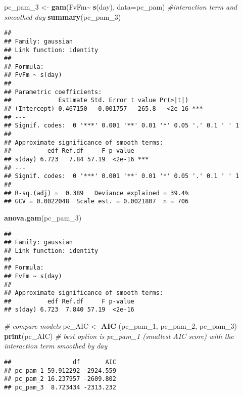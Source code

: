 \documentclass[
]{article}
\newenvironment{Shaded}{\begin{snugshade}}{\end{snugshade}}
\newcommand{\AttributeTok}[1]{\textcolor[rgb]{0.13,0.29,0.53}{#1}}
\newcommand{\CommentTok}[1]{\textcolor[rgb]{0.56,0.35,0.01}{\textit{#1}}}
\newcommand{\FunctionTok}[1]{\textcolor[rgb]{0.13,0.29,0.53}{\textbf{#1}}}
\newcommand{\NormalTok}[1]{#1}
\newcommand{\OtherTok}[1]{\textcolor[rgb]{0.56,0.35,0.01}{#1}}
\newcommand{\SpecialCharTok}[1]{\textcolor[rgb]{0.81,0.36,0.00}{\textbf{#1}}}
\begin{document}
\begin{Shaded}
\begin{Highlighting}[]
\NormalTok{pc\_pam\_3 }\OtherTok{\textless{}{-}} \FunctionTok{gam}\NormalTok{(FvFm}\SpecialCharTok{\textasciitilde{}} \FunctionTok{s}\NormalTok{(day), }\AttributeTok{data=}\NormalTok{pc\_pam) }\CommentTok{\#interaction term and smoothed day}
\FunctionTok{summary}\NormalTok{(pc\_pam\_3)}
\end{Highlighting}
\end{Shaded}

\begin{verbatim}
## 
## Family: gaussian 
## Link function: identity 
## 
## Formula:
## FvFm ~ s(day)
## 
## Parametric coefficients:
##             Estimate Std. Error t value Pr(>|t|)    
## (Intercept) 0.467150   0.001757   265.8   <2e-16 ***
## ---
## Signif. codes:  0 '***' 0.001 '**' 0.01 '*' 0.05 '.' 0.1 ' ' 1
## 
## Approximate significance of smooth terms:
##          edf Ref.df     F p-value    
## s(day) 6.723   7.84 57.19  <2e-16 ***
## ---
## Signif. codes:  0 '***' 0.001 '**' 0.01 '*' 0.05 '.' 0.1 ' ' 1
## 
## R-sq.(adj) =  0.389   Deviance explained = 39.4%
## GCV = 0.0022048  Scale est. = 0.0021807  n = 706
\end{verbatim}

\begin{Shaded}
\begin{Highlighting}[]
\FunctionTok{anova.gam}\NormalTok{(pc\_pam\_3)}
\end{Highlighting}
\end{Shaded}

\begin{verbatim}
## 
## Family: gaussian 
## Link function: identity 
## 
## Formula:
## FvFm ~ s(day)
## 
## Approximate significance of smooth terms:
##          edf Ref.df     F p-value
## s(day) 6.723  7.840 57.19  <2e-16
\end{verbatim}

\begin{Shaded}
\begin{Highlighting}[]
\CommentTok{\# compare models}
\NormalTok{pc\_AIC }\OtherTok{\textless{}{-}} \FunctionTok{AIC}\NormalTok{ (pc\_pam\_1, pc\_pam\_2, pc\_pam\_3)}
\FunctionTok{print}\NormalTok{(pc\_AIC) }\CommentTok{\# best option is pc\_pam\_1 (smallest AIC score) with the interaction term smoothed by day}
\end{Highlighting}
\end{Shaded}

\begin{verbatim}
##                 df       AIC
## pc_pam_1 59.912292 -2924.559
## pc_pam_2 16.237957 -2609.802
## pc_pam_3  8.723434 -2313.232
\end{verbatim}
\end{document}
